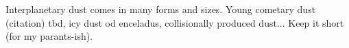 Interplanetary dust comes in many forms and sizes. Young cometary dust (citation) tbd, icy dust od enceladus, collisionally produced dust... Keep it short (for my parants-ish). 